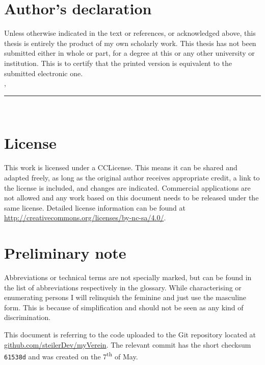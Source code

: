 \thispagestyle{empty}

\section*{Author's declaration}
\vspace*{1em}
Unless otherwise indicated in the text or references, or acknowledged above, this thesis is entirely the product of my own scholarly work. This thesis has not been submitted either in whole or part, for a degree at this or any other university or institution. This is to certify that the printed version is equivalent to the submitted electronic one.
\vspace{2em}\\
\abgabeort, \datumAbgabe
\vspace{3em}\\
\rule{6cm}{0.4pt}\\
\autor
\vspace*{1.5em}

\section*{License}

\vspace*{1.5em}
This work is licensed under a \acrfull{CCLicense}. This means it can be shared and adapted freely, as long as the original author receives appropriate credit, a link to the license is included, and changes are indicated. Commercial applications are not allowed and any work based on this document needs to be released under the same license. Detailed license information can be found at \url{http://creativecommons.org/licenses/by-nc-sa/4.0/}.
\vspace{1.5em}

\section*{Preliminary note}

\vspace*{1.5em}
Abbreviations or technical terms are not specially marked, but can be found in the list of abbreviations respectively in the glossary. While characterising or enumerating persons I will relinquish the feminine and just use the masculine form. This is because of simplification and should not be seen as any kind of discrimination. 

This document is referring to the code uploaded to the Git repository located at \url{github.com/steilerDev/myVerein}. The relevant commit has the short checksum \texttt{61538d} and was created on the 7\textsuperscript{th} of May.
